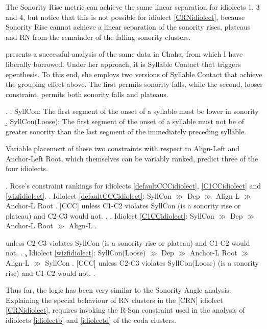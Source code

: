 \documentclass[12pt]{article}
\begin{document}

The {\sc Sonority Rise} metric can achieve the same linear separation for idiolects 1, 3 and 4, but notice that this is not possible for idiolect \ref{CRNidiolect}, because {\sc Sonority Rise} cannot achieve a linear separation of the sonority rises, plateaus and RN from the remainder of the falling sonority clusters.


\bigskip

\citet{rose.2000} presents a successful analysis of the same data in Chaha, from which I have liberally borrowed. Under her approach, it is Syllable Contact that triggers epenthesis. To this end, she employs two versions of Syllable Contact that achieve the grouping effect above. The first permits sonority falls, while the second, looser constraint, permits both sonority falls and plateaus.

\ex. \a. {\sc SyllCon}: The first segment of the onset of a syllable must be lower in sonority 
     \b. {\sc SyllCon(Loose}): The first segment of the onset of a syllable must not be of greater sonority than the last segment of the immediately preceding syllable.

Variable placement of these two constraints with respect to {\sc Align-Left} and {\sc Anchor-Left Root}, which themselves can be variably ranked, predict three of the four idiolects.

\ex. Rose's constraint rankings for idiolects \ref{defaultCCCidiolect}, \ref{C1CCidiolect} and \ref{wizfidiolect}.
    \a. Idiolect \ref{defaultCCCidiolect}: {\sc SyllCon} $\gg$ {\sc Dep} $\gg$ {\sc Align-L} $\gg$ {\sc Anchor-L Root}
          \a. [CCC] unless C1-C2 violates {\sc SyllCon}
               (is a sonority rise or plateau) and C2-C3 would not.
          \z.
     \b. Idiolect \ref{C1CCidiolect}: {\sc SyllCon} $\gg$ {\sc Dep} $\gg$ {\sc Anchor-L Root} $\gg$ {\sc Align-L} 
          \a. \item [C\textipa{1}CC] unless C2-C3 violates {\sc SyllCon}
                (is a sonority rise or plateau) and C1-C2 would not.
          \z.
     \c. Idiolect \ref{wizfidiolect}: {\sc SyllCon(Loose)} $\gg$ {\sc Dep} $\gg$ {\sc Anchor-L Root} $\gg$ {\sc Align-L} $\gg$ {\sc SyllCon}
          \a. [CCC] unless C2-C3 violates {\sc SyllCon(Loose)} 
                (is a sonority rise) and C1-C2 would not.
          \z.

Thus far, the logic has been very similar to the {\sc Sonority Angle} analysis. Explaining the special behaviour of RN clusters in the [CRN] idiolect \ref{CRNidiolect}, requires invoking the {\sc *R-Son} constraint used in the analysis of idiolects \ref{idiolectb} and \ref{idiolectd} of the coda clusters.
\end{document}
